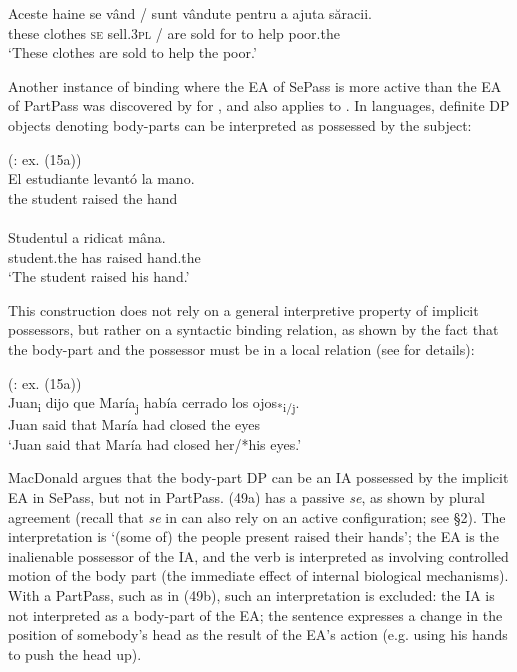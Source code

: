 \documentclass[output=paper]{langsci/langscibook}
\begin{document}
\ea%
    \label{ex:giurgea:46}
    \gll Aceste  haine   se vând     / sunt vândute pentru a ajuta săracii.\\
         these    clothes \textsc{se} sell.\textsc{3pl}  / are sold       for      to help poor.the\\
    \glt ‘These clothes are sold to help the poor.’
    \z

Another instance of binding where the EA of SePass is more active than the EA of PartPass was discovered by \citet{MacDonald2017} for , and also applies to . In  languages, definite DP objects denoting body-parts can be interpreted as possessed by the subject:

\ea%
    \label{ex:giurgea:47}
    \ea {} (\citealt{MacDonald2017}: ex. (15a))\\
    \gll El  estudiante levantó la mano.   \\
         the student     raised   the hand \\
    \ex {}\\
    \gll Studentul   a    ridicat mâna.  \\
         student.the has raised hand.the\\
    \glt ‘The student raised his hand.’
    \z
\z    

This construction does not rely on a general interpretive property of implicit possessors, but rather on a syntactic binding relation, as shown by the fact that the body-part and the possessor must be in a local relation (see \citealt{MacDonald2017} for details):

\ea%
     (\citealt{MacDonald2017}: ex. (15a))\label{ex:giurgea:48}\\
    \gll Juan\textsubscript{i} dijo que María\textsubscript{j} había cerrado los ojos\textsubscript{*i/j}.   \\
         Juan said that María  had    closed   the eyes      \\
    \glt ‘Juan said that María had closed her/*his eyes.’ 
    \z

MacDonald argues that the body-part DP can be an IA possessed by the implicit EA in SePass, but not in PartPass. (49a) has a passive \textit{se}, as shown by plural agreement (recall that \textit{se} in  can also rely on an active configuration; see §2). The interpretation is ‘(some of) the people present raised their hands’; the EA is the inalienable possessor of the IA, and the verb is interpreted as involving controlled motion of the body part (the immediate effect of internal biological mechanisms). With a PartPass, such as in (49b), such an interpretation is excluded: the IA is not interpreted as a body-part of the EA; the sentence expresses a change in the position of somebody’s head as the result of the EA’s action (e.g. using his hands to push the head up).   
\end{document}
